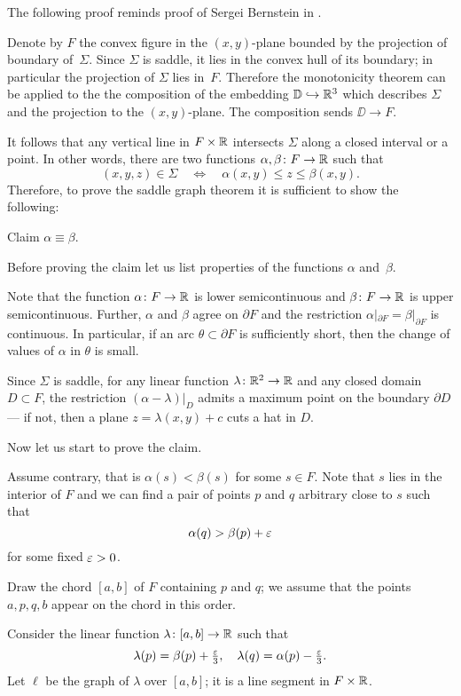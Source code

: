 \documentclass{article}
\begin{document}
The following proof reminds proof of Sergei Bernstein in \cite{bernstein}.

Denote by $F$ the convex figure in the $(x,y)$-plane bounded by the projection of boundary of~$\Sigma$.
Since $\Sigma$ is saddle, it lies in the convex hull of its boundary;
in particular the projection of $\Sigma$ lies in~$F$.
Therefore the monotonicity theorem can be applied to the
the composition of the embedding $\mathbb{D}\hookrightarrow \mathbb{R}^3$ which describes $\Sigma$ and the projection
to the $(x,y)$-plane. The composition sends $\DD\to F$.

It follows that any vertical line in $F\times \mathbb{R}$ intersects $\Sigma$ along a closed interval or a point.
In other words, there are two functions $\alpha,\beta\colon F\to \mathbb{R}$
such that 
\[(x,y,z)\in \Sigma
\quad\iff\quad
\alpha(x,y)\le z\le \beta(x,y).\]
Therefore, to prove the saddle graph theorem it is sufficient to show the following:

\begin{thm}{Claim}
$\alpha\equiv \beta$.
\end{thm}

Before proving the claim let us list properties of the functions $\alpha$ and~$\beta$. 

Note that the function $\alpha\colon F\to \mathbb{R}$ is lower semicontinuous
and $\beta\colon F\to \mathbb{R}$ is upper semicontinuous.
Further, $\alpha$ and $\beta$ agree on $\partial F$ and the 
restriction $\alpha|_{\partial F}=\beta|_{\partial F}$ is continuous.
In particular, if an arc $\theta\subset \partial F$ is sufficiently short, then
the change of values of $\alpha$ in $\theta$ is small.

Since $\Sigma$ is saddle, for any linear function $\lambda\colon\mathbb{R}^2\to\mathbb{R}$ and any closed domain $D\subset F$, 
the restriction $(\alpha-\lambda)|_D$ admits a maximum point on the boundary $\partial D$ --- if not, then a plane $z=\lambda(x,y)+c$ cuts a hat in $D$.

Now let us start to prove the claim.

Assume contrary, that is $\alpha(s)<\beta(s)$ for some $s\in F$.
Note that $s$ lies in the interior of $F$ and we can find a pair of points $p$ and $q$ arbitrary close to $s$
such that 
\[\alpha(q)>\beta(p)+\varepsilon\]
for some fixed $\varepsilon>0$.

Draw the chord $[a,b]$ of $F$ containing $p$ and $q$;
we assume that the points $a,p,q,b$ appear on the chord in this order.

Consider the linear function $\lambda\colon[a,b]\to \mathbb{R}$ such that 
\[\lambda(p)=\beta(p)+\tfrac{\varepsilon}3,\quad\lambda(q)=\alpha(p)-\tfrac{\varepsilon}3.\]
Let $\ell$ be the graph of $\lambda$ over $[a,b]$; it is a line segment in $F\times \mathbb{R}$.
\end{document}
